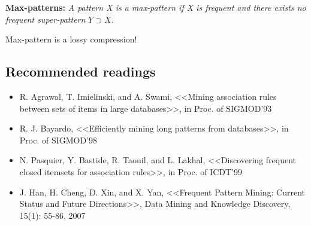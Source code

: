 \begin{definition}
\textbf{Max-patterns:} \textit{A pattern X is a max-pattern if X is frequent and there exists no frequent super-pattern $Y \supset X$}.
\end{definition}
Max-pattern is a lossy compression!

\subsection{Recommended readings}
\begin{itemize}
\item R. Agrawal, T. Imielinski, and A. Swami, <<Mining association rules between sets of items in large databases>>, in Proc. of SIGMOD'93
\item R. J. Bayardo, <<Efficiently mining long patterns from databases>>, in Proc. of SIGMOD'98
\item N. Pasquier, Y. Bastide, R. Taouil, and L. Lakhal, <<Discovering frequent closed itemsets
for association rules>>, in Proc. of ICDT'99
\item J. Han, H. Cheng, D. Xin, and X. Yan, <<Frequent Pattern Mining: Current Status and Future Directions>>, Data Mining and Knowledge Discovery, 15(1): 55-86, 2007
\end{itemize}
